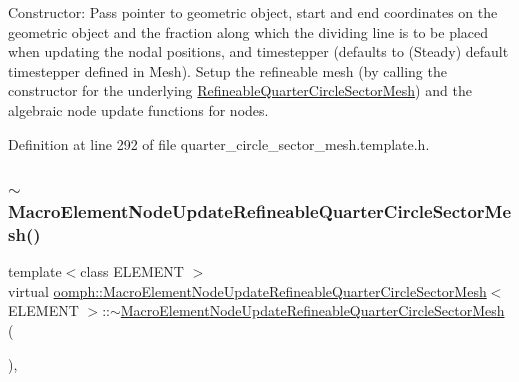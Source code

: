 Constructor\+: Pass pointer to geometric object, start and end coordinates on the geometric object and the fraction along which the dividing line is to be placed when updating the nodal positions, and timestepper (defaults to (Steady) default timestepper defined in Mesh). Setup the refineable mesh (by calling the constructor for the underlying \hyperlink{classoomph_1_1RefineableQuarterCircleSectorMesh}{Refineable\+Quarter\+Circle\+Sector\+Mesh}) and the algebraic node update functions for nodes. 



Definition at line 292 of file quarter\+\_\+circle\+\_\+sector\+\_\+mesh.\+template.\+h.

\mbox{\label{classoomph_1_1MacroElementNodeUpdateRefineableQuarterCircleSectorMesh_a2d8953d309eba614524fce77c44c8d46}} 
\subsubsection{\texorpdfstring{$\sim$\+Macro\+Element\+Node\+Update\+Refineable\+Quarter\+Circle\+Sector\+Mesh()}{~MacroElementNodeUpdateRefineableQuarterCircleSectorMesh()}}
{\footnotesize\ttfamily template$<$class E\+L\+E\+M\+E\+NT $>$ \\
virtual \hyperlink{classoomph_1_1MacroElementNodeUpdateRefineableQuarterCircleSectorMesh}{oomph\+::\+Macro\+Element\+Node\+Update\+Refineable\+Quarter\+Circle\+Sector\+Mesh}$<$ E\+L\+E\+M\+E\+NT $>$\+::$\sim$\hyperlink{classoomph_1_1MacroElementNodeUpdateRefineableQuarterCircleSectorMesh}{Macro\+Element\+Node\+Update\+Refineable\+Quarter\+Circle\+Sector\+Mesh} (\begin{DoxyParamCaption}{ }\end{DoxyParamCaption})\hspace{0.3cm}{\ttfamily [inline]}, {\ttfamily [virtual]}}



